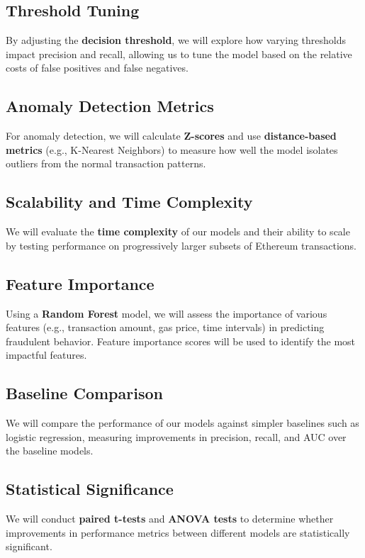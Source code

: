 \documentclass[sigconf]{acmart}
\begin{document}
\subsection{Threshold Tuning}
By adjusting the \textbf{decision threshold}, we will explore how varying thresholds impact precision and recall, allowing us to tune the model based on the relative costs of false positives and false negatives.

\subsection{Anomaly Detection Metrics}
For anomaly detection, we will calculate \textbf{Z-scores} and use \textbf{distance-based metrics} (e.g., K-Nearest Neighbors) to measure how well the model isolates outliers from the normal transaction patterns.

\subsection{Scalability and Time Complexity}
We will evaluate the \textbf{time complexity} of our models and their ability to scale by testing performance on progressively larger subsets of Ethereum transactions.

\subsection{Feature Importance}
Using a \textbf{Random Forest} model, we will assess the importance of various features (e.g., transaction amount, gas price, time intervals) in predicting fraudulent behavior. Feature importance scores will be used to identify the most impactful features.

\subsection{Baseline Comparison}
We will compare the performance of our models against simpler baselines such as logistic regression, measuring improvements in precision, recall, and AUC over the baseline models.

\subsection{Statistical Significance}
We will conduct \textbf{paired t-tests} and \textbf{ANOVA tests} to determine whether improvements in performance metrics between different models are statistically significant.
\end{document}

